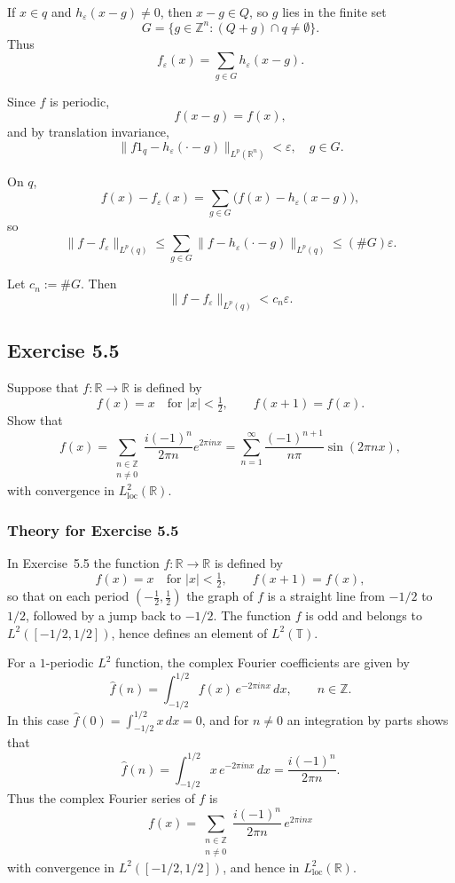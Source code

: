 \documentclass[12pt,a4paper]{article}
\theoremstyle{plain}
\theoremstyle{definition}
\theoremstyle{remark}
\theoremstyle{remark}
\begin{document}
If $x\in q$ and $h_\varepsilon(x-g)\neq 0$, then $x-g\in Q$, so $g$ lies in the finite set
\[
G = \{g\in\mathbb{Z}^n : (Q+g)\cap q \neq \emptyset\}.
\]
Thus
\[
f_\varepsilon(x) = \sum_{g\in G} h_\varepsilon(x-g).
\]

Since $f$ is periodic,
\[
f(x-g)=f(x),
\]
and by translation invariance,
\[
\|f1_q - h_\varepsilon(\cdot - g)\|_{L^p(\mathbb{R}^n)} < \varepsilon,
\quad g\in G.
\]

On $q$,
\[
f(x)-f_\varepsilon(x)
= \sum_{g\in G} \bigl(f(x) - h_\varepsilon(x-g)\bigr),
\]
so
\[
\|f - f_\varepsilon\|_{L^p(q)}
\le \sum_{g\in G} \|f - h_\varepsilon(\cdot-g)\|_{L^p(q)}
\le (\#G)\varepsilon.
\]

Let $c_n := \#G$. Then
\[
\|f - f_\varepsilon\|_{L^p(q)} < c_n \varepsilon.
\]


\subsection*{Exercise 5.5}
Suppose that $f:\mathbb{R}\to\mathbb{R}$ is defined by
\[
f(x) = x \quad\text{for } |x| < \tfrac12,
\qquad
f(x+1) = f(x).
\]
Show that
\[
f(x)
= \sum_{\substack{n\in\mathbb{Z}\\ n\neq 0}}
\frac{i(-1)^n}{2\pi n} e^{2\pi i n x}
= \sum_{n=1}^\infty \frac{(-1)^{n+1}}{n\pi}\sin(2\pi n x),
\]
with convergence in $L^2_{\mathrm{loc}}(\mathbb{R})$.


\subsubsection*{Theory for Exercise 5.5}

In Exercise~5.5 the function $f:\mathbb{R}\to\mathbb{R}$ is defined by
\[
f(x) = x \quad\text{for } |x|<\tfrac12,
\qquad f(x+1)=f(x),
\]
so that on each period $(-\tfrac12,\tfrac12)$ the graph of $f$ is a
straight line from $-1/2$ to $1/2$, followed by a jump back to $-1/2$.
The function $f$ is odd and belongs to $L^2([-1/2,1/2])$, hence defines
an element of $L^2(\mathbb{T})$.

For a $1$-periodic $L^2$ function, the complex Fourier coefficients are
given by
\[
\widehat{f}(n) = \int_{-1/2}^{1/2} f(x)\,e^{-2\pi i n x}\,dx,
\qquad n\in\mathbb{Z}.
\]
In this case $\widehat{f}(0)=\int_{-1/2}^{1/2}x\,dx=0$, and for
$n\neq 0$ an integration by parts shows that
\[
\widehat{f}(n)
= \int_{-1/2}^{1/2} x\,e^{-2\pi i n x}\,dx
= \frac{i(-1)^n}{2\pi n}.
\]
Thus the complex Fourier series of $f$ is
\[
f(x) = \sum_{\substack{n\in\mathbb{Z}\\ n\neq 0}}
\frac{i(-1)^n}{2\pi n}\,e^{2\pi i n x}
\]
with convergence in $L^2([-1/2,1/2])$, and hence in
$L^2_{\mathrm{loc}}(\mathbb{R})$.
\end{document}
